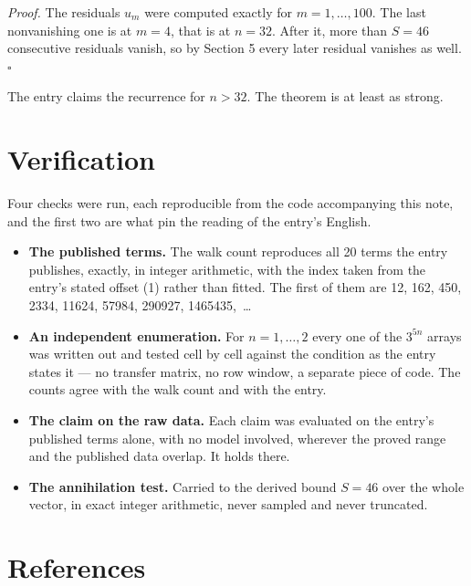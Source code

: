 \documentclass[11pt]{article}
\theoremstyle{definition}
\begin{document}
{\itshape Proof.} The residuals $u_m$ were computed exactly for $m = 1,\dots,100$. The last nonvanishing one is at $m = 4$, that is at $n = 32$. After it, more than $S = 46$ consecutive residuals vanish, so by Section 5 every later residual vanishes as well. $\square$

The entry claims the recurrence for $n > 32$. The theorem is at least as strong.

\section{Verification}

Four checks were run, each reproducible from the code accompanying this note, and the first two are what pin the reading of the entry's English.

\begin{itemize}

\item {\bfseries The published terms.} The walk count reproduces all 20 terms the entry publishes, exactly, in integer arithmetic, with the index taken from the entry's stated offset (1) rather than fitted. The first of them are 12, 162, 450, 2334, 11624, 57984, 290927, 1465435,~\dots

\item {\bfseries An independent enumeration.} For $n = 1,\dots,2$ every one of the $3^{5n}$ arrays was written out and tested cell by cell against the condition as the entry states it --- no transfer matrix, no row window, a separate piece of code. The counts agree with the walk count and with the entry.

\item {\bfseries The claim on the raw data.} Each claim was evaluated on the entry's published terms alone, with no model involved, wherever the proved range and the published data overlap. It holds there.

\item {\bfseries The annihilation test.} Carried to the derived bound $S = 46$ over the whole vector, in exact integer arithmetic, never sampled and never truncated.

\end{itemize}

\section{References}
\end{document}
